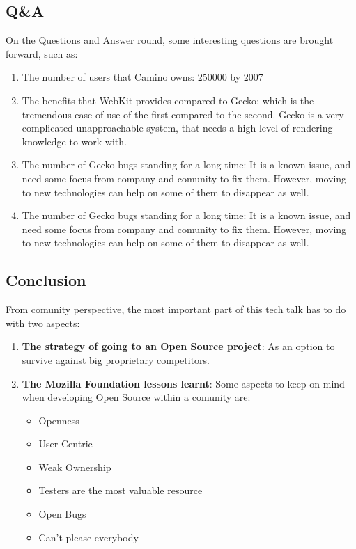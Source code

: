 \documentclass[11pt]{article}
\begin{document}
\subsection{Q\&A}
On the Questions and Answer round, some interesting questions are brought forward, such as:
\begin{enumerate}\itemsep0pt
\item{The number of users that Camino owns}: 250000 by 2007
\item{The benefits that WebKit provides compared to Gecko}: which is the tremendous ease of use of the first compared to the second. Gecko is a very complicated unapproachable system, that needs a high level of rendering knowledge to work with.
\item{The number of Gecko bugs standing for a long time}: It is a known issue, and need some focus from company and comunity to fix them. However, moving to new technologies can help on some of them to disappear as well.
\item{The number of Gecko bugs standing for a long time}: It is a known issue, and need some focus from company and comunity to fix them. However, moving to new technologies can help on some of them to disappear as well.
\end{enumerate}

\subsection{Conclusion}
From comunity perspective, the most important part of this tech talk has to do with two aspects:
\begin{enumerate}
\item{\textbf{The strategy of going to an Open Source project}}: As an option to survive against big proprietary competitors.
\item{\textbf{The Mozilla Foundation lessons learnt}}: Some aspects to keep on mind when developing Open Source within a comunity are:
\begin{itemize}
\item{Openness}
\item{User Centric}
\item{Weak Ownership}
\item{Testers are the most valuable resource}
\item{Open Bugs}
\item{Can't please everybody}
\end{itemize}
\end{enumerate}
\end{document}
